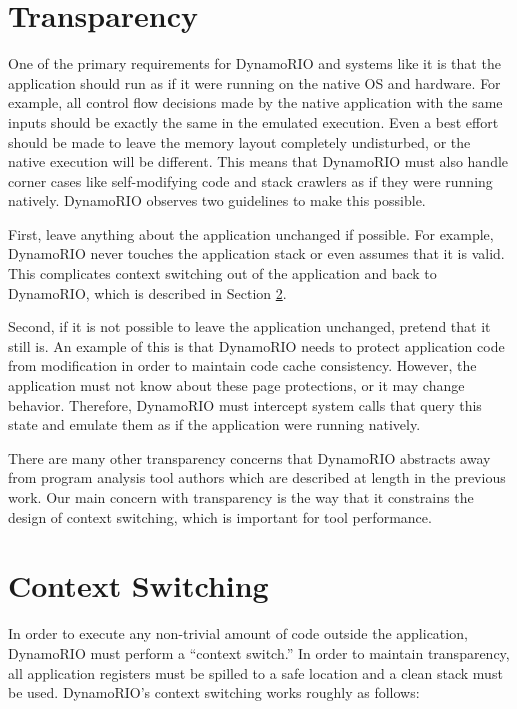 
\section{Transparency}
\label{sec:transparency}

One of the primary requirements for DynamoRIO and systems like it is that the
application should run as if it were running on the native OS and hardware.  For
example, all control flow decisions made by the native application with the same
inputs should be exactly the same in the emulated execution.  Even a best effort
should be made to leave the memory layout completely undisturbed, or the native
execution will be different.  This means that DynamoRIO must also handle corner
cases like self-modifying code and stack crawlers as if they were running
natively.  DynamoRIO observes two guidelines to make this possible.

First, leave anything about the application unchanged if possible.  For example,
DynamoRIO never touches the application stack or even assumes that it is valid.
This complicates context switching out of the application and back to DynamoRIO,
which is described in Section \ref{sec:context_switching}.

Second, if it is not possible to leave the application unchanged, pretend that
it still is.  An example of this is that DynamoRIO needs to protect application
code from modification in order to maintain code cache consistency.  However,
the application must not know about these page protections, or it may change
behavior.  Therefore, DynamoRIO must intercept system calls that query this
state and emulate them as if the application were running natively.

There are many other transparency concerns that DynamoRIO abstracts away from
program analysis tool authors which are described at length in the previous
work.  Our main concern with transparency is the way that it constrains the
design of context switching, which is important for tool performance.

\section{Context Switching}
\label{sec:context_switching}

In order to execute any non-trivial amount of code outside the application,
DynamoRIO must perform a ``context switch.''  In order to maintain transparency,
all application registers must be spilled to a safe location and a clean stack
must be used.  DynamoRIO's context switching works roughly as follows:

